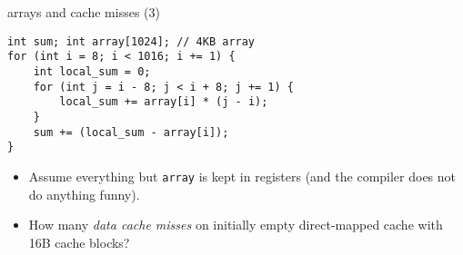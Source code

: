 
\begin{frame}[fragile,label=arrayMisses4]{arrays and cache misses (3)}
\begin{lstlisting}
int sum; int array[1024]; // 4KB array
for (int i = 8; i < 1016; i += 1) {
    int local_sum = 0;
    for (int j = i - 8; j < i + 8; j += 1) {
        local_sum += array[i] * (j - i);
    }
    sum += (local_sum - array[i]);
}
\end{lstlisting}
    \begin{itemize}
        \item {\small
    Assume everything but {\tt array} is kept in registers (and the compiler does not do
    anything funny).
        }
    \item
        How many \textit{data cache misses} on initially empty  direct-mapped cache with 16B cache blocks?
    \end{itemize}
\end{frame}

